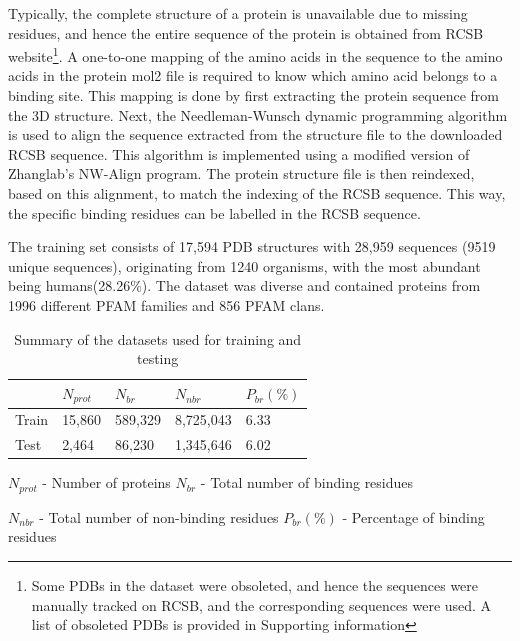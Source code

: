 \documentclass[journal=jacsat,manuscript=article]{achemso}
\begin{document}
\newpage
Typically, the complete structure of a protein is unavailable due to missing residues, and hence the entire sequence of the protein is obtained from RCSB \cite{burley2021rcsb} website\footnote{Some PDBs in the dataset were obsoleted, and hence the sequences were manually tracked on RCSB, and the corresponding sequences were used. A list of obsoleted PDBs is provided in Supporting information}. A one-to-one mapping of the amino acids in the sequence to the amino acids in the protein mol2 file is required to know which amino acid belongs to a binding site. This mapping is done by first extracting the protein sequence from the 3D structure. Next, the Needleman-Wunsch dynamic programming algorithm\cite{needleman1970general} is used to align the sequence extracted from the structure file to the downloaded RCSB sequence. This algorithm is implemented using a modified version of Zhanglab's NW-Align program\cite{NWAlign}. The protein structure file is then reindexed, based on this alignment, to match the indexing of the RCSB sequence. This way, the specific binding residues can be labelled in the RCSB sequence.


The training set consists of 17,594 PDB structures with 28,959 sequences (9519 unique sequences), originating from 1240 organisms, with the most abundant being humans(28.26\%). The dataset was diverse and contained proteins from 1996 different PFAM families and 856 PFAM clans.

\begin{table}
    \centering
    \begin{tabular}{| P{2.75cm} | P{2.75cm} | P{2.75cm} | P{2.75cm} | P{2.75cm} |}
        \hline
              & $N_{prot}$ & $N_{br}$ & $N_{nbr}$ & $P_{br}(\%)$ \\
        \hline
        Train & 15,860     & 589,329  & 8,725,043 & 6.33         \\
        Test  & 2,464      & 86,230   & 1,345,646 & 6.02         \\
        \hline
    \end{tabular}
    \caption{\label{tab:dataset_summary} Summary of the datasets used for training and testing}
    \vspace{5 mm}
    \noindent $N_{prot}$ - Number of proteins \hfill $N_{br}$ - Total number of binding residues

    \vspace{3 mm}

    \noindent $N_{nbr}$ - Total number of non-binding residues \hfill $P_{br}(\%)$ - Percentage of binding residues
\end{table}
\end{document}
